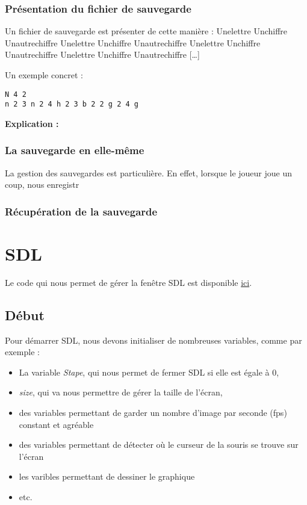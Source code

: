 \documentclass[letter]{article}
\begin{document}
\subsubsection{Présentation du fichier de sauvegarde}
\label{sec:org99b6329}

Un fichier de sauvegarde est présenter de cette manière :
Unelettre Unchiffre Unautrechiffre
Unelettre Unchiffre Unautrechiffre Unelettre Unchiffre Unautrechiffre Unelettre Unchiffre Unautrechiffre [\ldots{}]

Un exemple concret :
\begin{verbatim}
N 4 2
n 2 3 n 2 4 h 2 3 b 2 2 g 2 4 g 
\end{verbatim}

\textbf{Explication :}




\subsubsection{La sauvegarde en elle-même}
\label{sec:org738bca4}
La gestion des sauvegardes est particulière.
En effet, lorsque le joueur joue un coup, nous enregistr

\subsubsection{Récupération de la sauvegarde}
\label{sec:org78730c2}

\section{SDL}
\label{sec:org5279e08}

Le code qui nous permet de gérer la fenêtre SDL est disponible \href{render.c}{ici}.

\subsection{Début}
\label{sec:orgb8981dd}

Pour démarrer SDL, nous devons initialiser de nombreuses variables, comme par exemple :

\begin{itemize}
\item La variable \emph{Stape}, qui nous permet de fermer SDL si elle est égale à 0,
\item \emph{size}, qui va nous permettre de gérer la taille de l'écran,
\item des variables permettant de garder un nombre d'image par seconde (fps) constant et agréable
\item des variables permettant de détecter où le curseur de la souris se trouve sur l'écran
\item les varibles permettant de dessiner le graphique
\item etc.
\end{itemize}
\end{document}
